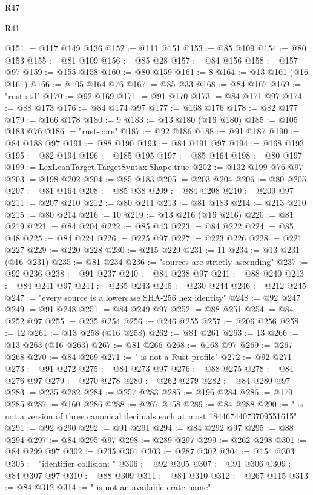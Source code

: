 \begin{lexlean}{R47}
\begin{lexlean}{R41}
\begin{coremodule}
{{{{{{{{{{{{{{{{{{{{{{{{{{{{{{{{{{{{{{{{{{{{{{{{{{{{{{{{{{{{{{{{{{{{{{{{{{{{{{{{{{{{{{{@151 := @117 @149 @136
@152 := @111 @151
@153 := @85 @109
@154 := @80 @153
@155 := @81 @109
@156 := @85 @28
@157 := @84 @156
@158 := @157 @97
@159 := @155 @158
@160 := @80 @159
@161 := 8
@164 := @13 @161 (@16 @161)
@166 := @105 @164 @76
@167 := @85 @33
@168 := @84 @167
@169 := "rust-std"
@170 := @92 @169
@171 := @91 @170
@173 := @84 @171 @97
@174 := @88 @173
@176 := @84 @174 @97
@177 := @168 @176
@178 := @82 @177
@179 := @166 @178
@180 := 9
@183 := @13 @180 (@16 @180)
@185 := @105 @183 @76
@186 := "rust-core"
@187 := @92 @186
@188 := @91 @187
@190 := @84 @188 @97
@191 := @88 @190
@193 := @84 @191 @97
@194 := @168 @193
@195 := @82 @194
@196 := @185 @195
@197 := @85 @164
@198 := @80 @197
@199 := LexLeanTarget.TargetSyntax.Shape.true
@202 := @132 @199 @76 @97
@203 := @198 @202
@204 := @85 @183
@205 := @203 @204
@206 := @80 @205
@207 := @81 @164
@208 := @85 @38
@209 := @84 @208
@210 := @209 @97
@211 := @207 @210
@212 := @80 @211
@213 := @81 @183
@214 := @213 @210
@215 := @80 @214
@216 := 10
@219 := @13 @216 (@16 @216)
@220 := @81 @219
@221 := @84 @204
@222 := @85 @43
@223 := @84 @222
@224 := @85 @48
@225 := @84 @224
@226 := @225 @97
@227 := @223 @226
@228 := @221 @227
@229 := @220 @228
@230 := @215 @229
@231 := 11
@234 := @13 @231 (@16 @231)
@235 := @81 @234
@236 := "sources are strictly ascending"
@237 := @92 @236
@238 := @91 @237
@240 := @84 @238 @97
@241 := @88 @240
@243 := @84 @241 @97
@244 := @235 @243
@245 := @230 @244
@246 := @212 @245
@247 := "every source is a lowercase SHA-256 hex identity"
@248 := @92 @247
@249 := @91 @248
@251 := @84 @249 @97
@252 := @88 @251
@254 := @84 @252 @97
@255 := @235 @254
@256 := @246 @255
@257 := @206 @256
@258 := 12
@261 := @13 @258 (@16 @258)
@262 := @81 @261
@263 := 13
@266 := @13 @263 (@16 @263)
@267 := @81 @266
@268 := @168 @97
@269 := @267 @268
@270 := @84 @269
@271 := " is not a Rust profile"
@272 := @92 @271
@273 := @91 @272
@275 := @84 @273 @97
@276 := @88 @275
@278 := @84 @276 @97
@279 := @270 @278
@280 := @262 @279
@282 := @84 @280 @97
@283 := @235 @282
@284 := @257 @283
@285 := @196 @284
@286 := @179 @285
@287 := @160 @286
@288 := @267 @158
@289 := @84 @288
@290 := " is not a version of three canonical decimals each at most 18446744073709551615"
@291 := @92 @290
@292 := @91 @291
@294 := @84 @292 @97
@295 := @88 @294
@297 := @84 @295 @97
@298 := @289 @297
@299 := @262 @298
@301 := @84 @299 @97
@302 := @235 @301
@303 := @287 @302
@304 := @154 @303
@305 := "identifier collision: "
@306 := @92 @305
@307 := @91 @306
@309 := @84 @307 @97
@310 := @88 @309
@311 := @84 @310
@312 := @267 @115
@313 := @84 @312
@314 := " is not an available crate name"
}}}}}}}}}}}}}}}}}}}}}}}}}}}}}}}}}}}}}}}}}}}}}}}}}}}}}}}}}}}}}}}}}}}}}}}}}}}}}}}}}}}}}}}
\end{coremodule}
\end{lexlean}
\end{lexlean}
